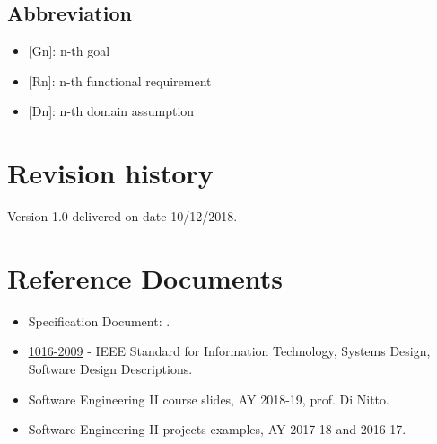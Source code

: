 \subsection{Abbreviation}
\begin{itemize}
    \item {[Gn]}: n-th goal
    \item {[Rn]}: n-th functional requirement
    \item {[Dn]}: n-th domain assumption
\end{itemize}

\section{Revision history}
Version 1.0 delivered on date 10/12/2018.

\section{Reference Documents}
\begin{itemize}
    \item Specification Document: . 
    \item \href{https://ieeexplore.ieee.org/document/5167255} {\underline{1016-2009}} - IEEE Standard for Information Technology, Systems Design, Software Design Descriptions.
    \item Software Engineering II course slides, AY 2018-19, prof. Di Nitto.
    \item Software Engineering II projects examples, AY 2017-18 and 2016-17.
\end{itemize}

